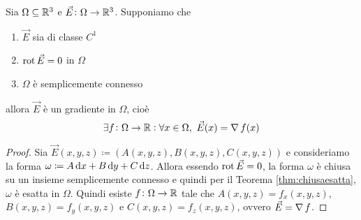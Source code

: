 \begin{prop}
	Sia $ \Omega \subseteq \mathbb{R}^3 $ e $ \vec{E} \colon \Omega \to \mathbb{R}^3 $. Supponiamo che
	\begin{enumerate}[label = (\roman*)]
		\item $ \vec{E} $ sia di classe $ C^1 $
		\item $ \operatorname{rot}{\vec{E}} = 0 $ in $ \Omega $
		\item $ \Omega $ è semplicemente connesso
	\end{enumerate} 
	allora $ \vec{E} $ è un gradiente in $ \Omega $, cioè 
	\begin{equation}
		\exists f \colon \Omega \to \mathbb{R} : \forall x \in \Omega, \ \vec{E}(x) = \operatorname{\nabla}{f}(x)
	\end{equation}
\end{prop}
%
\begin{proof}
	Sia $ \vec{E}(x, y, z) \coloneqq (A(x, y, z), B(x, y, z), C(x, y, z)) $ e consideriamo la forma $ \omega \coloneqq A \dif{x} + B \dif{y} + C \dif{z} $. Allora essendo $ \operatorname{rot}{\vec{E}} = 0 $, la forma $ \omega $ è chiusa su un insieme semplicemente connesso e quindi per il Teorema \ref{thm:chiusaesatta}, $ \omega $ è esatta in $ \Omega $. Quindi esiste $ f \colon \Omega \to \mathbb{R} $ tale che $ A(x, y, z) = f_x(x, y, z) $, $ B(x, y, z) = f_y(x, y, z) $ e $ C(x, y, z) = f_z(x, y, z) $, ovvero $ \vec{E} = \operatorname{\nabla}{f} $.
\end{proof}


